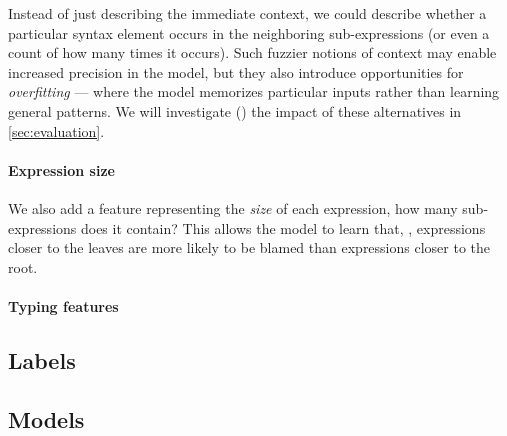 Instead of just describing the immediate context, we could describe
whether a particular syntax element occurs in the neighboring
sub-expressions (or even a count of how many times it occurs).
%
Such fuzzier notions of context may enable increased precision in the
model, but they also introduce opportunities for \emph{overfitting} ---
where the model memorizes particular inputs rather than learning general
patterns.
%
We will investigate () the impact of these alternatives
in \autoref{sec:evaluation}.

\paragraph{Expression size}
We also add a feature representing the \emph{size} of each expression,
\ie how many sub-expressions does it contain?
%
This allows the model to learn that, \eg, expressions closer to the
leaves are more likely to be blamed than expressions closer to the root.

\paragraph{Typing features}


\subsection{Labels}
\label{sec:labels}

\subsection{Models}
\label{sec:models}





